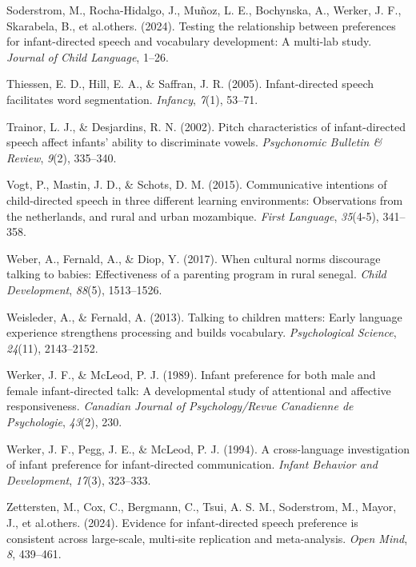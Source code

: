 \documentclass[
  english,
  ,man,floatsintext]{apa6}
\newlength{\cslhangindent}
\newenvironment{CSLReferences}[2] %
 {\begin{list}{}{%
  \setlength{\itemindent}{0pt}
  \setlength{\leftmargin}{0pt}
  \setlength{\parsep}{0pt}
  \ifodd #1
   \setlength{\leftmargin}{\cslhangindent}
   \setlength{\itemindent}{-1\cslhangindent}
  \fi
  \setlength{\itemsep}{#2\baselineskip}}}
 {\end{list}}
\begin{document}
\begin{CSLReferences}{1}{0}
Soderstrom, M., Rocha-Hidalgo, J., Muñoz, L. E., Bochynska, A., Werker, J. F., Skarabela, B., et al.others. (2024). Testing the relationship between preferences for infant-directed speech and vocabulary development: A multi-lab study. \emph{Journal of Child Language}, 1--26.

Thiessen, E. D., Hill, E. A., \& Saffran, J. R. (2005). Infant-directed speech facilitates word segmentation. \emph{Infancy}, \emph{7}(1), 53--71.

Trainor, L. J., \& Desjardins, R. N. (2002). Pitch characteristics of infant-directed speech affect infants' ability to discriminate vowels. \emph{Psychonomic Bulletin \& Review}, \emph{9}(2), 335--340.

Vogt, P., Mastin, J. D., \& Schots, D. M. (2015). Communicative intentions of child-directed speech in three different learning environments: Observations from the netherlands, and rural and urban mozambique. \emph{First Language}, \emph{35}(4-5), 341--358.

Weber, A., Fernald, A., \& Diop, Y. (2017). When cultural norms discourage talking to babies: Effectiveness of a parenting program in rural senegal. \emph{Child Development}, \emph{88}(5), 1513--1526.

Weisleder, A., \& Fernald, A. (2013). Talking to children matters: Early language experience strengthens processing and builds vocabulary. \emph{Psychological Science}, \emph{24}(11), 2143--2152.

Werker, J. F., \& McLeod, P. J. (1989). Infant preference for both male and female infant-directed talk: A developmental study of attentional and affective responsiveness. \emph{Canadian Journal of Psychology/Revue Canadienne de Psychologie}, \emph{43}(2), 230.

Werker, J. F., Pegg, J. E., \& McLeod, P. J. (1994). A cross-language investigation of infant preference for infant-directed communication. \emph{Infant Behavior and Development}, \emph{17}(3), 323--333.

Zettersten, M., Cox, C., Bergmann, C., Tsui, A. S. M., Soderstrom, M., Mayor, J., et al.others. (2024). Evidence for infant-directed speech preference is consistent across large-scale, multi-site replication and meta-analysis. \emph{Open Mind}, \emph{8}, 439--461.

\end{CSLReferences}
\end{document}
